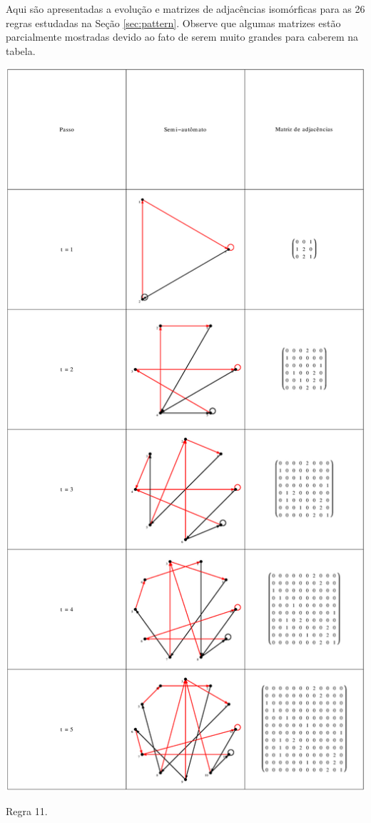 \documentclass[12pt,a4paper]{article}
\begin{document}
Aqui são apresentadas a evolução e matrizes de adjacências isomórficas
para as 26 regras estudadas na Seção \ref{sec:pattern}. Observe que
algumas matrizes estão parcialmente mostradas devido ao fato de serem muito
grandes para caberem na tabela.

\newpage

\begin{table}[H]
\begin{center}
\includegraphics[scale=0.32]{img/mat/matr11.eps}
\caption{Regra 11.}
\label{tab:mr11}
\end{center}
\end{table}
\end{document}
